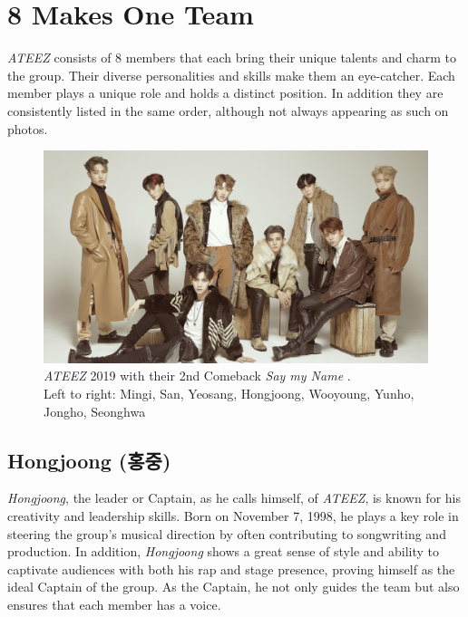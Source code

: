 \documentclass[a4paper,12pt]{article}
\begin{document}
\section{8 Makes One Team}
\textit{ATEEZ} consists of 8 members that each bring their unique talents and charm to the group. Their diverse personalities and skills make them an eye-catcher. Each member plays a unique role and holds a distinct position. In addition they are consistently listed in the same order, although not always appearing as such on photos.\\

\begin{figure}[h]
    \centering  %
    \includegraphics[width=1\textwidth]{images/ateez_group.jpg}
    \caption{\textit{ATEEZ} 2019 with their 2nd Comeback \textit{Say my Name} \cite{ateez_saymyname}.\\ Left to right: Mingi, San, Yeosang, Hongjoong, Wooyoung, Yunho, Jongho, Seonghwa}
    \label{fig:ateezgroup}
\end{figure}

\subsection{Hongjoong (홍중)}\label{sec:memberhongjoong}
\textit{Hongjoong}, the leader or Captain, as he calls himself, of \textit{ATEEZ}, is known for his creativity and leadership skills. Born on November 7, 1998, he plays a key role in steering the group's musical direction by often contributing to songwriting and production. In addition, \textit{Hongjoong} shows a great sense of style and ability to captivate audiences with both his rap and stage presence, proving himself as the ideal Captain of the group. As the Captain, he not only guides the team but also ensures that each member has a voice.
\end{document}
